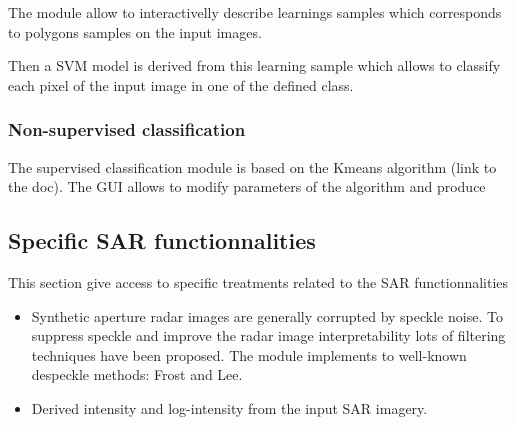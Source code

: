 The module allow to interactivelly describe learnings samples which corresponds to polygons samples on the input images.

Then a SVM model is derived from this learning sample which allows to classify each pixel of the 
input image in one of the defined class.
 

\subsubsection{Non-supervised classification}
The supervised classification  module is based on the Kmeans algorithm (link to the doc).
The GUI allows to modify parameters of the algorithm and produce
\subsection{Specific SAR functionnalities}
This section give access to specific treatments related to the SAR functionnalities

\begin{itemize}
\item Synthetic aperture radar images are generally corrupted by speckle noise. 
To suppress speckle and improve the radar image interpretability lots of filtering techniques have been proposed.
The module implements to well-known despeckle methods: Frost and Lee.
\item Derived intensity and log-intensity from the input SAR imagery.
\end{itemize}
